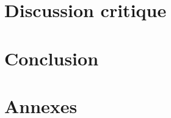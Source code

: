 \documentclass[12pt,a4paper]{report}
\begin{document}

\chapter{Discussion critique}

\chapter{Conclusion}

\appendix
\chapter{Annexes}
\end{document}
